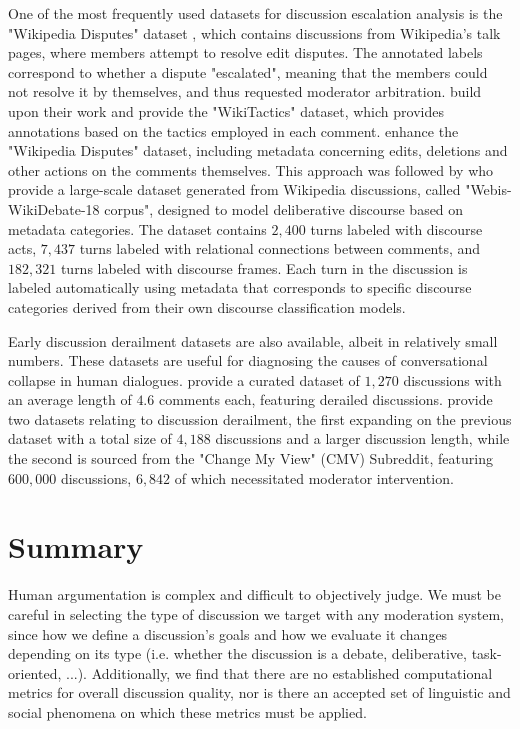 One of the most frequently used datasets for discussion escalation analysis is the "Wikipedia Disputes" dataset \cite{de-kock-vlachos-2021-beg}, which contains discussions from Wikipedia's talk pages, where members attempt to resolve edit disputes. The annotated labels correspond to whether a dispute "escalated", meaning that the members could not resolve it by themselves, and thus requested moderator arbitration. \citet{dekock2022disagree} build upon their work and provide the "WikiTactics" dataset, which provides annotations based on the tactics employed in each comment. \citet{hua2018wikiconvcorpuscompleteconversational} enhance the "Wikipedia Disputes" dataset, including metadata concerning edits, deletions and other actions on the comments themselves. This approach was followed by \citet{al-khatib-etal-2018-modeling} who provide a large-scale dataset generated from Wikipedia discussions, called "Webis-WikiDebate-18 corpus", designed to model deliberative discourse based on metadata categories. The dataset contains $2,400$ turns labeled with discourse acts, $7,437$ turns labeled with relational connections between comments, and $182,321$ turns labeled with discourse frames. Each turn in the discussion is labeled automatically using metadata that corresponds to specific discourse categories derived from their own discourse classification models.

Early discussion derailment datasets are also available, albeit in relatively small numbers. These datasets are useful for diagnosing the causes of conversational collapse in human dialogues. \citet{zhang-2018-gone-awry} provide a curated dataset of $1,270$ discussions with an average length of $4.6$ comments each, featuring derailed discussions. \citet{chang-danescu-niculescu-mizil-2019-trouble} provide two datasets relating to discussion derailment, the first expanding on the previous dataset with a total size of $4,188$ discussions and a larger discussion length, while the second is sourced from the "Change My View" (CMV) Subreddit, featuring $600,000$ discussions, $6,842$ of which necessitated moderator intervention.


\section{Summary}

Human argumentation is complex and difficult to objectively judge. We must be careful in selecting the type of discussion we target with any moderation system, since how we define a discussion's goals and how we evaluate it changes depending on  its type (i.e. whether the discussion is a debate, deliberative, task-oriented, ...). Additionally, we find that there are no established computational metrics for overall discussion quality, nor is there an accepted set of linguistic and social phenomena on which these metrics must be applied.


